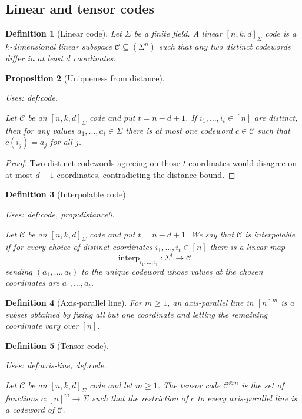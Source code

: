 \documentclass{article}
\providecommand{\uses}[1]{\par\smallskip\noindent\emph{Uses:} #1.\par\smallskip}
\newtheorem{definition}{Definition}[section]
\newtheorem{proposition}[definition]{Proposition}
\theoremstyle{remark}
\newcommand{\code}{\mathcal{C}}
\begin{document}
\subsection{Linear and tensor codes}

\begin{definition}[Linear code]\label{def:code}
  Let $\Sigma$ be a finite field. A linear $[n,k,d]_\Sigma$ code is a $k$-dimensional linear subspace $\code\subseteq (\Sigma^n)$ such that any two distinct codewords differ in at least $d$ coordinates.
\end{definition}

\begin{proposition}[Uniqueness from distance]\label{prop:distance0}
  \uses{def:code}
  Let $\code$ be an $[n,k,d]_\Sigma$ code and put $t=n-d+1$. If $i_1,\dots,i_t\in [n]$ are distinct, then for any values $a_1,\dots,a_t\in\Sigma$ there is at most one codeword $c\in\code$ such that $c(i_j)=a_j$ for all $j$.
\end{proposition}
\begin{proof}
  Two distinct codewords agreeing on those $t$ coordinates would disagree on at most $d-1$ coordinates, contradicting the distance bound.
\end{proof}

\begin{definition}[Interpolable code]\label{def:interpolable}
  \uses{def:code, prop:distance0}
  Let $\code$ be an $[n,k,d]_\Sigma$ code and put $t=n-d+1$. We say that $\code$ is \emph{interpolable} if for every choice of distinct coordinates $i_1,\dots,i_t\in [n]$ there is a linear map
  \[
    \operatorname{interp}_{i_1,\dots,i_t}\colon \Sigma^t\to \code
  \]
  sending $(a_1,\dots,a_t)$ to the unique codeword whose values at the chosen coordinates are $a_1,\dots,a_t$.
\end{definition}

\begin{definition}[Axis-parallel line]\label{def:axis-line}
  For $m\ge 1$, an \emph{axis-parallel line} in $[n]^m$ is a subset obtained by fixing all but one coordinate and letting the remaining coordinate vary over $[n]$.
\end{definition}

\begin{definition}[Tensor code]\label{def:tensor-code}
  \uses{def:axis-line, def:code}
  Let $\code$ be an $[n,k,d]_\Sigma$ code and let $m\ge 1$. The tensor code $\code^{\otimes m}$ is the set of functions $c\colon [n]^m\to \Sigma$ such that the restriction of $c$ to every axis-parallel line is a codeword of $\code$.
\end{definition}
\end{document}
